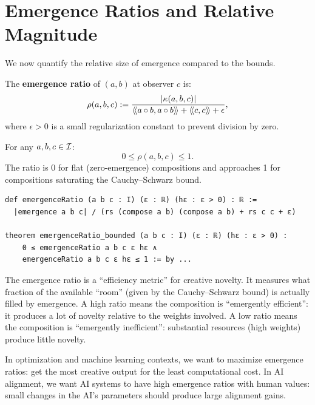 \section{Emergence Ratios and Relative Magnitude}

We now quantify the relative size of emergence compared to the bounds.

\begin{definition}
\label{def:emergence-ratio}
The \textbf{emergence ratio} of $(a,b)$ at observer $c$ is:
\[
  \rho(a,b,c) := \frac{|\kappa(a,b,c)|}{\langle\!\langle a \circ b, a \circ b \rangle\!\rangle + \langle\!\langle c, c \rangle\!\rangle + \epsilon},
\]
where $\epsilon > 0$ is a small regularization constant to prevent division by zero.
\end{definition}

\begin{theorem}
\label{thm:emergence-ratio-bounded}
For any $a, b, c \in \mathcal{I}$:
\[
  0 \leq \rho(a,b,c) \leq 1.
\]
The ratio is 0 for flat (zero-emergence) compositions and approaches 1 for
compositions saturating the Cauchy--Schwarz bound.
\end{theorem}

\begin{lstlisting}[caption={Emergence ratio (IDT\_v3\_Emergence.lean)}]
def emergenceRatio (a b c : I) (ε : ℝ) (hε : ε > 0) : ℝ :=
  |emergence a b c| / (rs (compose a b) (compose a b) + rs c c + ε)

theorem emergenceRatio_bounded (a b c : I) (ε : ℝ) (hε : ε > 0) :
    0 ≤ emergenceRatio a b c ε hε ∧
    emergenceRatio a b c ε hε ≤ 1 := by ...
\end{lstlisting}

\begin{interpretation}
The emergence ratio is a ``efficiency metric'' for creative novelty. It measures
what fraction of the available ``room'' (given by the Cauchy--Schwarz bound)
is actually filled by emergence. A high ratio means the composition is
``emergently efficient'': it produces a lot of novelty relative to the weights
involved. A low ratio means the composition is ``emergently inefficient'':
substantial resources (high weights) produce little novelty.

In optimization and machine learning contexts, we want to maximize emergence
ratios: get the most creative output for the least computational cost. In AI
alignment, we want AI systems to have high emergence ratios with human values:
small changes in the AI's parameters should produce large alignment gains.
\end{interpretation}



